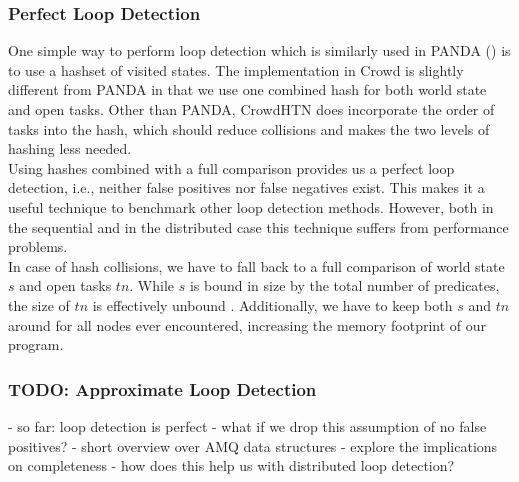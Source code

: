 \subsubsection{Perfect Loop Detection}
\label{ld - perfect loop detection}
One simple way to perform loop detection which is similarly used in PANDA (\cite{holler2021loop}) is to use a hashset of visited states. The implementation in Crowd is slightly different from PANDA in that we use one combined hash for both world state and open tasks. Other than PANDA, CrowdHTN does incorporate the order of tasks into the hash, which should reduce collisions and makes the two levels of hashing less needed. \\
Using hashes combined with a full comparison provides us a perfect loop detection, i.e., neither false positives nor false negatives exist. This makes it a useful technique to benchmark other loop detection methods. However, both in the sequential and in the distributed case this technique suffers from performance problems. \\
In case of hash collisions, we have to fall back to a full comparison of world state $s$ and open tasks $tn$. While $s$ is bound in size by the total number of predicates, the size of $tn$ is effectively unbound . Additionally, we have to keep both $s$ and $tn$ around for all nodes ever encountered, increasing the memory footprint of our program.
\begin{comment}
	- Additionally, there is the full comparison for the world state
	- in practise this can be a problem, at the same time asymptotically it should not matter as it will be dwarfed by the 
	\todo{get some data on how many nodes share a world state on average as well as sizes of world states -> number of hash operations per world state!}
	- and the full comparison of open tasks
	- we cannot just free the open tasks and world state that are no longer needed! Both time and memory footprint are worse
	- worse memory and time complexity
	- however, it is a useful benchmark as to how many loops we *should* expect
\end{comment}

\subsubsection{TODO: Approximate Loop Detection}
- so far: loop detection is perfect
- what if we drop this assumption of no false positives?
- short overview over AMQ data structures
- explore the implications on completeness
- how does this help us with distributed loop detection?

